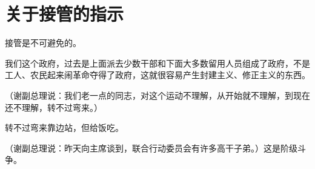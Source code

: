 \section[关于接管的指示（一九六七年一月）]{关于接管的指示}


接管是不可避免的。

我们这个政府，过去是上面派去少数干部和下面大多数留用人员组成了政府，不是工人、农民起来闹革命夺得了政府，这就很容易产生封建主义、修正主义的东西。

（谢副总理说：我们老一点的同志，对这个运动不理解，从开始就不理解，到现在还不理解，转不过弯来。）

转不过弯来靠边站，但给饭吃。

（谢副总理说：昨天向主席谈到，联合行动委员会有许多高干子弟。）这是阶级斗争。


